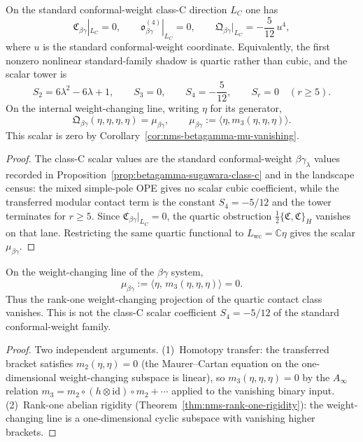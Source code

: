 \begin{theorem}
\label{thm:nms-betagamma-quartic-birth}
On the standard conformal-weight class-C direction $L_C$ one has
\[
\mathfrak C_{\beta\gamma}|_{L_C}=0,
\qquad
\mathfrak o_{\beta\gamma}^{(4)}|_{L_C}=0,
\qquad
\mathfrak Q_{\beta\gamma}|_{L_C}=-\frac{5}{12}\,u^4,
\]
where $u$ is the standard conformal-weight coordinate. Equivalently,
the first nonzero nonlinear standard-family shadow is quartic rather
than cubic, and the scalar tower is
\[
S_2=6\lambda^2-6\lambda+1,\qquad
S_3=0,\qquad
S_4=-\frac{5}{12},\qquad
S_r=0\quad(r\ge5).
\]
On the internal weight-changing line, writing $\eta$ for its generator,
\[
\mathfrak Q_{\beta\gamma}(\eta,\eta,\eta,\eta)
=
\mu_{\beta\gamma},
\qquad
\mu_{\beta\gamma}:=\langle \eta,m_3(\eta,\eta,\eta)\rangle.
\]
This scalar is zero by
Corollary~\ref{cor:nms-betagamma-mu-vanishing}.
\end{theorem}

\begin{proof}
The class-C scalar values are the standard conformal-weight
$\beta\gamma_\lambda$ values recorded in
Proposition~\ref{prop:betagamma-sugawara-class-c} and in the landscape
census: the mixed simple-pole OPE gives no scalar cubic coefficient,
while the transferred modular contact term is the constant
$S_4=-5/12$ and the tower terminates for $r\ge5$. Since
$\mathfrak C_{\beta\gamma}|_{L_C}=0$, the quartic obstruction
$\frac12\{\mathfrak C,\mathfrak C\}_H$ vanishes on that lane.
Restricting the same quartic functional to
$L_{\mathrm{wc}}=\mathbb C\eta$ gives the scalar
$\mu_{\beta\gamma}$.\qedhere
\end{proof}

\begin{corollary}
\label{cor:nms-betagamma-mu-vanishing}
On the weight-changing line of the $\beta\gamma$ system,
\[
 \mu_{\beta\gamma} := \langle \eta,\, m_3(\eta,\eta,\eta) \rangle = 0.
\]
Thus the rank-one weight-changing projection of the quartic contact
class vanishes. This is not the class-C scalar coefficient
$S_4=-5/12$ of the standard conformal-weight family.
\end{corollary}

\begin{proof}
Two independent arguments.
(1)~Homotopy transfer: the transferred bracket satisfies
$m_2(\eta,\eta) = 0$ (the Maurer--Cartan equation on the one-dimensional
weight-changing subspace is linear), so
$m_3(\eta,\eta,\eta) = 0$ by the $A_\infty$ relation
$m_3 = m_2 \circ (h \otimes \mathrm{id}) \circ m_2 + \cdots$
applied to the vanishing binary input.
(2)~Rank-one abelian rigidity (Theorem~\ref{thm:nms-rank-one-rigidity}):
the weight-changing line is a one-dimensional cyclic subspace with
vanishing higher brackets.
\end{proof}

